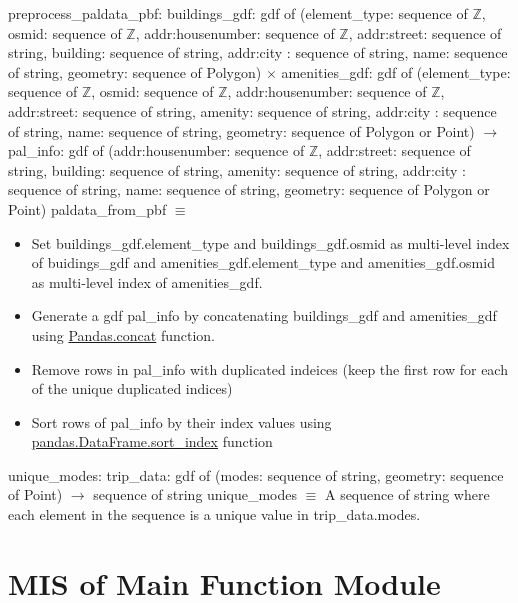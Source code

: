 \documentclass[12pt, titlepage]{article}
\begin{document}
preprocess\_paldata\_pbf: \newline
buildings\_gdf: gdf of (element\_type: sequence of $\mathbb{Z}$, osmid: sequence of $\mathbb{Z}$, addr:housenumber: sequence of $\mathbb{Z}$, addr:street: sequence of string, building: sequence of string, addr:city : sequence of string, name: sequence of string, geometry: sequence of Polygon) $\times$ \newline
amenities\_gdf: gdf of (element\_type: sequence of $\mathbb{Z}$, osmid: sequence of $\mathbb{Z}$, addr:housenumber: sequence of $\mathbb{Z}$, addr:street: sequence of string, amenity: sequence of string, addr:city : sequence of string, name: sequence of string, geometry: sequence of Polygon or Point) \newline $\rightarrow$ \newline
pal\_info: gdf of (addr:housenumber: sequence of $\mathbb{Z}$, addr:street: sequence of string, building: sequence of string, amenity: sequence of string, addr:city : sequence of string, name: sequence of string, geometry: sequence of Polygon or Point)\newline
paldata\_from\_pbf $\equiv$
\begin{itemize}
    \item Set buildings\_gdf.element\_type and buildings\_gdf.osmid as multi-level index of buidings\_gdf and amenities\_gdf.element\_type and amenities\_gdf.osmid as multi-level index of amenities\_gdf.\
    \item Generate a gdf pal\_info by concatenating buildings\_gdf and amenities\_gdf using \href{https://pandas.pydata.org/docs/reference/api/pandas.concat.html}{Pandas.concat} function.
    \item Remove rows in pal\_info with duplicated indeices (keep the first row for each of the unique duplicated indices)
    \item Sort rows of pal\_info by their index values using \href{https://pandas.pydata.org/docs/reference/api/pandas.DataFrame.sort_index.html}{pandas.DataFrame.sort\_index} function
\end{itemize}
unique\_modes: trip\_data: gdf of (modes: sequence of string, geometry: sequence of Point) $\rightarrow$ sequence of string\newline
unique\_modes $\equiv$ A sequence of string where each element in the sequence is a unique value in trip\_data.modes.
\newpage

\section{MIS of Main Function Module} \label{Main} %
\end{document}
